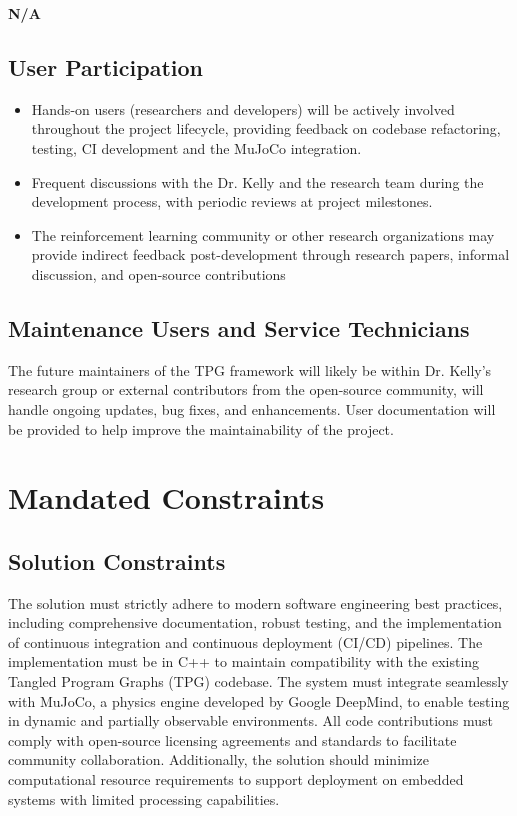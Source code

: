 \documentclass[12pt]{article}
\begin{document}
\textbf{N/A}

\subsection{User Participation}
\begin{itemize}
  \item Hands-on users (researchers and developers) will be actively involved throughout the project lifecycle, providing feedback on codebase refactoring, testing, CI development and the MuJoCo integration.


  \item Frequent discussions with the Dr. Kelly and the research team during the development process, with periodic reviews at project milestones.

  \item The reinforcement learning community or other research organizations may provide indirect feedback post-development through research papers, informal discussion, and open-source contributions


  \end{itemize}
\subsection{Maintenance Users and Service Technicians}
The future maintainers of the TPG framework will likely be within Dr. Kelly’s research group or external contributors from the open-source community, will handle ongoing updates, bug fixes, and enhancements. User documentation will be provided to help improve the maintainability of the project.


\section{Mandated Constraints}

\subsection{Solution Constraints}
The solution must strictly adhere to modern software engineering best practices, including comprehensive documentation, robust testing, and the implementation of continuous integration and continuous deployment (CI/CD) pipelines. The implementation must be in C++ to maintain compatibility with the existing Tangled Program Graphs (TPG) codebase. The system must integrate seamlessly with MuJoCo, a physics engine developed by Google DeepMind, to enable testing in dynamic and partially observable environments. All code contributions must comply with open-source licensing agreements and standards to facilitate community collaboration. Additionally, the solution should minimize computational resource requirements to support deployment on embedded systems with limited processing capabilities.
\end{document}

